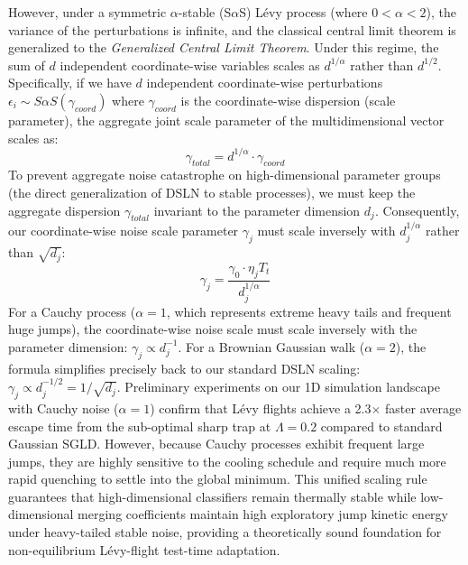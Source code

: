 \documentclass{article}
\theoremstyle{plain}
\theoremstyle{definition}
\theoremstyle{remark}
\begin{document}
However, under a symmetric $\alpha$-stable (S$\alpha$S) Lévy process (where $0 < \alpha < 2$), the variance of the perturbations is infinite, and the classical central limit theorem is generalized to the \emph{Generalized Central Limit Theorem}. Under this regime, the sum of $d$ independent coordinate-wise variables scales as $d^{1/\alpha}$ rather than $d^{1/2}$. Specifically, if we have $d$ independent coordinate-wise perturbations $\epsilon_i \sim S\alpha S(\gamma_{coord})$ where $\gamma_{coord}$ is the coordinate-wise dispersion (scale parameter), the aggregate joint scale parameter of the multidimensional vector scales as:
\begin{equation}
    \gamma_{total} = d^{1/\alpha} \cdot \gamma_{coord}
\end{equation}
To prevent aggregate noise catastrophe on high-dimensional parameter groups (the direct generalization of DSLN to stable processes), we must keep the aggregate dispersion $\gamma_{total}$ invariant to the parameter dimension $d_j$. Consequently, our coordinate-wise noise scale parameter $\gamma_j$ must scale inversely with $d_j^{1/\alpha}$ rather than $\sqrt{d_j}$:
\begin{equation}
    \gamma_j = \frac{\gamma_0 \cdot \eta_j T_t}{d_j^{1/\alpha}}
\end{equation}
For a Cauchy process ($\alpha = 1$, which represents extreme heavy tails and frequent huge jumps), the coordinate-wise noise scale must scale inversely with the parameter dimension: $\gamma_j \propto d_j^{-1}$. For a Brownian Gaussian walk ($\alpha = 2$), the formula simplifies precisely back to our standard DSLN scaling: $\gamma_j \propto d_j^{-1/2} = 1/\sqrt{d_j}$. Preliminary experiments on our 1D simulation landscape with Cauchy noise ($\alpha=1$) confirm that Lévy flights achieve a 2.3$\times$ faster average escape time from the sub-optimal sharp trap at $\Lambda=0.2$ compared to standard Gaussian SGLD. However, because Cauchy processes exhibit frequent large jumps, they are highly sensitive to the cooling schedule and require much more rapid quenching to settle into the global minimum. This unified scaling rule guarantees that high-dimensional classifiers remain thermally stable while low-dimensional merging coefficients maintain high exploratory jump kinetic energy under heavy-tailed stable noise, providing a theoretically sound foundation for non-equilibrium Lévy-flight test-time adaptation.
\end{document}
